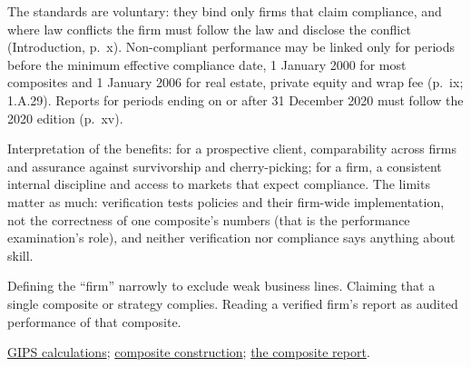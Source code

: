 \begin{qfdefinition}
 The standards are voluntary: they bind only firms that claim compliance, and where law conflicts the firm must follow the law and disclose the conflict (Introduction, p.~x). Non-compliant performance may be linked only for periods before the minimum effective compliance date, 1 January 2000 for most composites and 1 January 2006 for real estate, private equity and wrap fee (p.~ix; 1.A.29). Reports for periods ending on or after 31 December 2020 must follow the 2020 edition (p.~xv).

 Interpretation of the benefits: for a prospective client, comparability across firms and assurance against survivorship and cherry-picking; for a firm, a consistent internal discipline and access to markets that expect compliance. The limits matter as much: verification tests policies and their firm-wide implementation, not the correctness of one composite's numbers (that is the performance examination's role), and neither verification nor compliance says anything about skill.

 Defining the ``firm'' narrowly to exclude weak business lines. Claiming that a single composite or strategy complies. Reading a verified firm's report as audited performance of that composite.

 \hyperref[meth:gips-return-calculations]{GIPS calculations}; \hyperref[meth:gips-composite-membership]{composite construction}; \hyperref[meth:gips-composite-presentation]{the composite report}.

\end{qfdefinition}

